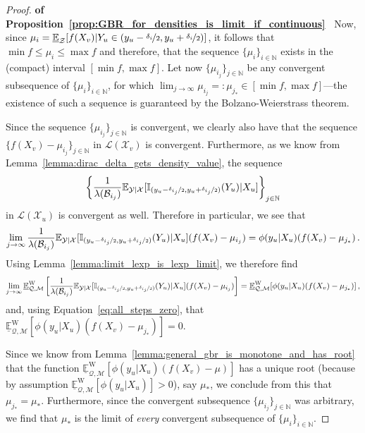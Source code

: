 \documentclass[twoside,11pt]{article}
\newcommand{\nats}{\mathbb{N}}
\newcommand{\states}{\mathcal{X}}
\newcommand{\observs}{\mathcal{Y}}
\newcommand{\lexp}{\underline{\mathbb{E}}_{\rateset,\mathcal{M}}^\mathrm{W}}
\newcommand{\gambles}{\mathcal{L}}
\newcommand{\ind}[1]{\mathbb{I}_{#1}}
\newcommand{\rateset}{\mathcal{Q}}
\begin{document}
\begin{proof}{\bf of Proposition~\ref{prop:GBR_for_densities_is_limit_if_continuous}~}
Now, since $\mu_i = \underline{\mathbb{E}}_{\mathcal{Z}}[f(X_v)\vert Y_u\in (y_u-\nicefrac{\delta_i}{2},y_u+\nicefrac{\delta_i}{2})]$, it follows that $\min f\leq \mu_i\leq \max f$ and therefore, that the sequence $\{\mu_i\}_{i\in\nats}$ exists in the (compact) interval $[\min f, \max f]$. Let now $\{\mu_{i_j}\}_{j\in\nats}$ be any convergent subsequence of $\{\mu_i\}_{i\in\nats}$, for which $\lim_{j\to\infty}\mu_{i_j}=:\mu_{j_*}\in[\min f,\max f]$---the existence of such a sequence is guaranteed by the Bolzano-Weierstrass theorem.

Since the sequence $\{\mu_{i_j}\}_{j\in\nats}$ is convergent, we clearly also have that the sequence $\{f(X_v)-\mu_{i_j}\}_{j\in\nats}$ in $\gambles(\states_v)$ is convergent. Furthermore, as we know from Lemma~\ref{lemma:dirac_delta_gets_density_value}, the sequence 
\begin{equation*}
\left\{\frac{1}{\lambda(\mathcal{B}_{i_j})} \mathbb{E}_{\observs\vert\states}[\ind{(y_u-\nicefrac{\delta_{i_j}}{2},y_u+\nicefrac{\delta_{i_j}}{2})}(Y_u)\vert X_u]\right\}_{j\in\nats}
\end{equation*}
in $\gambles(\states_u)$ is convergent as well. Therefore in particular, we see that
\begin{equation*}
\lim_{j\to\infty} \frac{1}{\lambda(\mathcal{B}_{i_j})} \mathbb{E}_{\observs\vert\states}[\ind{(y_u-\nicefrac{\delta_{i_j}}{2},y_u+\nicefrac{\delta_{i_j}}{2})}(Y_u)\vert X_u](f(X_v) - \mu_{i_j}) = \phi(y_u\vert X_u)(f(X_v) - \mu_{j_*})\,.
\end{equation*}
Using Lemma~\ref{lemma:limit_lexp_is_lexp_limit}, we therefore find
\begin{equation*}
\lim_{j\to\infty} \lexp\left[\frac{1}{\lambda(\mathcal{B}_{i_j})} \mathbb{E}_{\observs\vert\states}[\ind{(y_u-\nicefrac{\delta_{i_j}}{2},y_u+\nicefrac{\delta_{i_j}}{2})}(Y_u)\vert X_u](f(X_v) - \mu_{i_j})\right] = \lexp[\phi(y_u\vert X_u)(f(X_v) - \mu_{j_*})]\,,
\end{equation*}
and, using Equation~\eqref{eq:all_steps_zero}, that $\lexp[\phi(y_u\vert X_u)(f(X_v) - \mu_{j_*})] = 0$.

Since we know from Lemma~\ref{lemma:general_gbr_is_monotone_and_has_root} that the function $\lexp[\phi(y_u\vert X_u)(f(X_v) - \mu)]$ has a unique root (because by assumption $\lexp[\phi(y_u\vert X_u)]>0$), say $\mu_*$, we conclude from this that $\mu_{j_*}=\mu_*$. Furthermore, since the convergent subsequence $\{\mu_{i_j}\}_{j\in\nats}$ was arbitrary, we find that $\mu_*$ is the limit of \emph{every} convergent subsequence of $\{\mu_i\}_{i\in\nats}$.


\end{proof}
\end{document}
